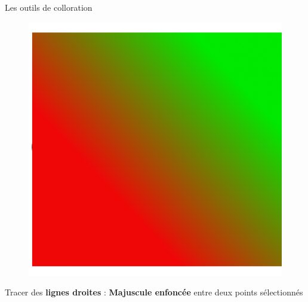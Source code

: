 \documentclass[10pt,svgnames,usenames,table]{beamer}
\begin{document}
\begin{frame}[allowframebreaks]{Les outils de colloration}
\begin{itemize}
\begin{minipage}{0.45\textwidth}
\begin{figure}
        	\includegraphics[width=\textwidth]{Images/degrade_ex2.png} 
	\end{figure}
	\end{minipage}
	
	
	Tracer des \textbf{lignes droites} : \textbf{Majuscule enfoncée} entre deux points sélectionnés
	\end{itemize}
\end{frame}


\end{document}
